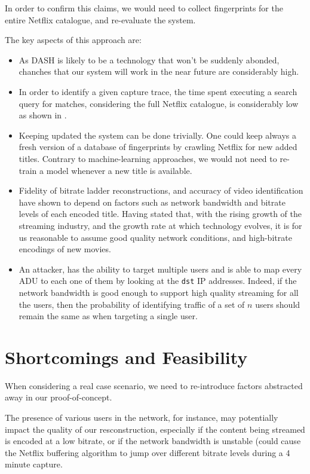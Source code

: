 In order to confirm this claims, we would need to collect fingerprints for the
entire Netflix catalogue, and re-evaluate the system. 

The key aspects of this approach are:

\begin{itemize}
    \item As DASH is likely to be a technology that won't be suddenly abonded,
        chanches that our system will work in the near future are considerably
        high.
    \item In order to identify a given capture trace, the time spent executing
        a search query for matches, considering the full Netflix catalogue, is
        considerably low as shown in \cite{netflix-real-time}.
    \item Keeping updated the system can be done trivially. One could keep
        always a fresh version of a database of fingerprints by crawling
        Netflix for new added titles. Contrary to machine-learning approaches,
        we would not need to re-train a model whenever a new title is available.
    \item Fidelity of bitrate ladder reconstructions, and accuracy of video
        identification have shown to depend on factors such as network
        bandwidth and bitrate levels of each encoded title. Having stated that,
        with the rising growth of the streaming industry, and the growth rate
        at which technology evolves, it is for us reasonable to assume good
        quality network conditions, and high-bitrate encodings of new movies.
    \item An attacker, has the ability to target multiple users and is able to
        map every ADU to each one of them by looking at the \texttt{dst} IP
        addresses. Indeed, if the network bandwidth is good enough to support
        high quality streaming for all the users, then the probability of
        identifying traffic of a set of $n$ users should remain the same as
        when targeting a single user.
\end{itemize}

\newpage
\section{Shortcomings and Feasibility}

When considering a real case scenario, we need to re-introduce factors
abstracted away in our proof-of-concept.

The presence of various users in the network, for instance, may potentially
impact the quality of our resconstruction, especially if the content being
streamed is encoded at a low bitrate, or if the network bandwidth is unstable
(could cause the Netflix buffering algorithm to jump over different bitrate
levels during a 4 minute capture. 

